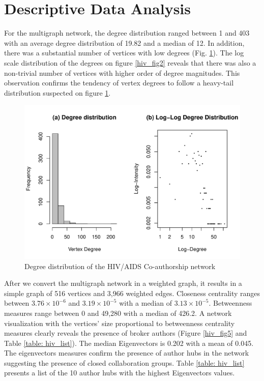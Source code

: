 \section{Descriptive Data Analysis}
\label{sec:hiv_descstat}
For the multigraph network, the degree distribution ranged between 1 and 403 with an average degree distribution of 19.82 and a median of 12. In addition, there was a substantial number of vertices with low degrees (Fig. \ref{hiv_fig1}). The log scale distribution of the degrees on figure \ref{hiv_fig2} reveals that there was also a non-trivial number of vertices with higher order of degree magnitudes. This observation confirms the tendency of vertex degrees to follow a heavy-tail distribution suspected on figure \ref{hiv_fig1}.

\begin{figure}[h!]
\centering
\includegraphics[scale=0.65]{Chapters/hiv/degreeDistribution}
\caption{Degree distribution of the HIV/AIDS Co-authorship network}
\label{hiv_fig1}
\end{figure}

After we convert the multigraph network in a weighted graph, it results in a simple graph of 516 vertices and 3,966 weighted edges. Closeness centrality ranges between $3.76\times 10^{-6}$ and $3.19\times 10^{-5}$ with a median of $3.13\times 10^{-5}$. Betweenness measures range between 0 and 49,280 with a median of 426.2. A network visualization with the vertices' size proportional to betweenness centrality measures clearly reveals the presence of broker authors (Figure \ref{hiv_fig5} and Table \ref{table: hiv_list}). The median Eigenvectors is 0.202 with a mean of 0.045. The eigenvectors measures confirm the presence of author hubs in the network suggesting the presence of closed collaboration groups. Table \ref{table: hiv_list} presents a list of the 10 author hubs with the highest Eigenvectors values.

